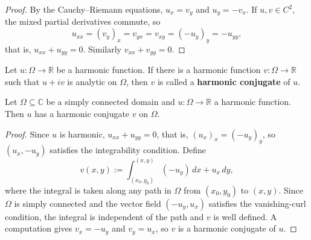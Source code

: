 \begin{proof}
By the Cauchy--Riemann equations, $u_x = v_y$ and $u_y = -v_x$. If $u, v \in C^2$, the mixed partial derivatives commute, so
\[
u_{xx} = (v_y)_x = v_{yx} = v_{xy} = (-u_y)_y = -u_{yy},
\]
that is, $u_{xx} + u_{yy} = 0$. Similarly $v_{xx} + v_{yy} = 0$.
\end{proof}

\begin{definition}\label{def:ca_harmonic_conjugate}
Let $u: \Omega \to \mathbb{R}$ be a harmonic function. If there is a harmonic function $v: \Omega \to \mathbb{R}$ such that $u + iv$ is analytic on $\Omega$, then $v$ is called a \textbf{harmonic conjugate} of $u$.
\end{definition}

\begin{proposition}\label{prop:ca_harmonic_conjugate_existence}
Let $\Omega \subseteq \mathbb{C}$ be a simply connected domain and $u: \Omega \to \mathbb{R}$ a harmonic function. Then $u$ has a harmonic conjugate $v$ on $\Omega$.
\end{proposition}

\begin{proof}
Since $u$ is harmonic, $u_{xx} + u_{yy} = 0$, that is, $(u_x)_x = (-u_y)_y$, so $(u_x, -u_y)$ satisfies the integrability condition. Define
\[
v(x, y) := \int_{(x_0, y_0)}^{(x, y)} (-u_y) \, dx + u_x \, dy,
\]
where the integral is taken along any path in $\Omega$ from $(x_0, y_0)$ to $(x, y)$. Since $\Omega$ is simply connected and the vector field $(-u_y, u_x)$ satisfies the vanishing-curl condition, the integral is independent of the path and $v$ is well defined. A computation gives $v_x = -u_y$ and $v_y = u_x$, so $v$ is a harmonic conjugate of $u$.
\end{proof}

